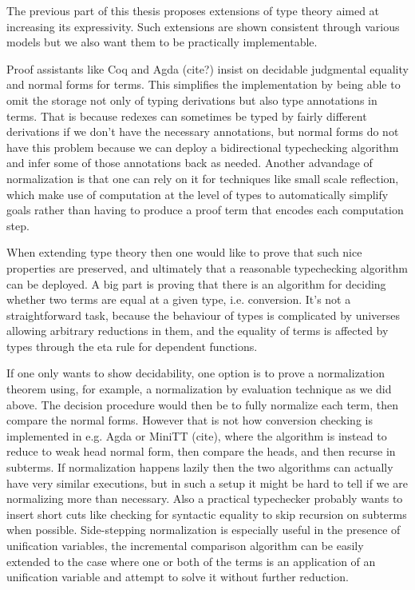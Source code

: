 \documentclass{book}
\begin{document}
The previous part of this thesis proposes extensions of type theory
aimed at increasing its expressivity. Such extensions are shown
consistent through various models but we also want them to be
practically implementable.

Proof assistants like Coq and Agda (cite?) insist on decidable
judgmental equality and normal forms for terms. This simplifies the
implementation by being able to omit the storage not only of typing
derivations but also type annotations in terms. That is because
redexes can sometimes be typed by fairly different derivations if we
don't have the necessary annotations, but normal forms do not have
this problem because we can deploy a bidirectional typechecking
algorithm and infer some of those annotations back as needed. Another
advandage of normalization is that one can rely on it for techniques
like small scale reflection, which make use of computation at the
level of types to automatically simplify goals rather than having to
produce a proof term that encodes each computation step.

When extending type theory then one would like to prove that such nice
properties are preserved, and ultimately that a reasonable
typechecking algorithm can be deployed. A big part is proving that
there is an algorithm for deciding whether two terms are equal at a
given type, i.e. conversion. It's not a straightforward task, because
the behaviour of types is complicated by universes allowing arbitrary
reductions in them, and the equality of terms is affected by types
through the eta rule for dependent functions.

If one only wants to show decidability, one option is to prove a
normalization theorem using, for example, a normalization by
evaluation technique as we did above. The decision procedure would
then be to fully normalize each term, then compare the normal forms.
However that is not how conversion checking is implemented in
e.g. Agda or MiniTT (cite), where the algorithm is instead to reduce
to weak head normal form, then compare the heads, and then recurse in
subterms. If normalization happens lazily then the two algorithms can
actually have very similar executions, but in such a setup it might be
hard to tell if we are normalizing more than necessary. Also a
practical typechecker probably wants to insert short cuts like
checking for syntactic equality to skip recursion on subterms when
possible. Side-stepping normalization is especially useful in the
presence of unification variables, the incremental comparison
algorithm can be easily extended to the case where one or both of the
terms is an application of an unification variable and attempt to
solve it without further reduction.
\end{document}
